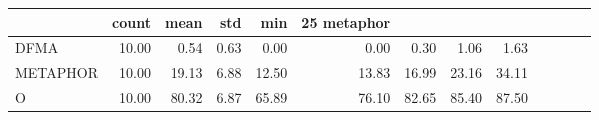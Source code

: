 \begin{tabular}{lrrrrrrrr}
\toprule
 & count & mean & std & min & 25%
metaphor &  &  &  &  &  &  &  &  \\
\midrule
DFMA & 10.00 & 0.54 & 0.63 & 0.00 & 0.00 & 0.30 & 1.06 & 1.63 \\
METAPHOR & 10.00 & 19.13 & 6.88 & 12.50 & 13.83 & 16.99 & 23.16 & 34.11 \\
O & 10.00 & 80.32 & 6.87 & 65.89 & 76.10 & 82.65 & 85.40 & 87.50 \\
\bottomrule
\end{tabular}
